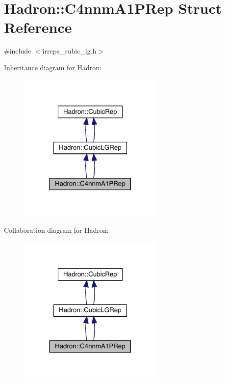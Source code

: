 \hypertarget{structHadron_1_1C4nnmA1PRep}{}\section{Hadron\+:\+:C4nnm\+A1\+P\+Rep Struct Reference}
\label{structHadron_1_1C4nnmA1PRep}


{\ttfamily \#include $<$irreps\+\_\+cubic\+\_\+lg.\+h$>$}



Inheritance diagram for Hadron\+:\nopagebreak
\begin{figure}[H]
\begin{center}
\leavevmode
\includegraphics[width=204pt]{d8/db4/structHadron_1_1C4nnmA1PRep__inherit__graph}
\end{center}
\end{figure}


Collaboration diagram for Hadron\+:\nopagebreak
\begin{figure}[H]
\begin{center}
\leavevmode
\includegraphics[width=204pt]{df/d02/structHadron_1_1C4nnmA1PRep__coll__graph}
\end{center}
\end{figure}

